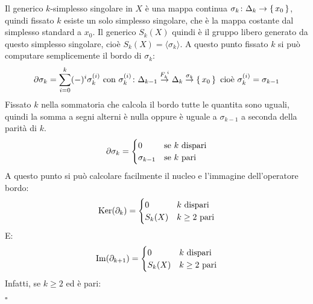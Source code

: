 \documentclass[10pt, twoside=false, x11names]{scrbook}
\newenvironment{proof}{{\textbf{Dimostrazione}:}}{\hfill $\square$}
\newcommand{\im}[1]{\mathrm{Im}( #1 )}
\renewcommand{\ker}[1]{\mathrm{Ker}( #1)}
\begin{document}
\begin{proof}
  Il generico $ k $-simplesso singolare in $ X $ è una mappa
  continua $ \sigma_k \colon \Delta_k \to \set{x_0} $, quindi fissato $ k $ esiste
  un solo simplesso singolare, che è la mappa costante dal simplesso
  standard a $ x_0 $. Il generico $ S_k(X) $ quindi è il gruppo libero
  generato da questo simplesso singolare, cioè $ S_k(X) = \langle\sigma_k\rangle $.
  A questo punto fissato $ k $ si può computare semplicemente il bordo di $ \sigma_k $:
  \[
    \partial \sigma_k = \sum_{i = 0}^k (-)^i \sigma_k^{(i)}  \text{ con }  \sigma_k^{(i)} \colon \Delta_{k-1} \overset{F_k^{\; i}}{\to} \Delta_k \overset{\sigma_k}{\to} \set{x_0}
    \text{ cioè } \sigma_k^{(i)}  = \sigma_{k-1}
  \]
  Fissato $ k $ nella sommatoria che calcola il bordo tutte le quantita sono uguali,
  quindi la somma a segni alterni è nulla oppure è uguale a $ \sigma_{k-1} $ a seconda
  della parità di $ k $.
  \[
    \partial \sigma_k =
    \begin{cases}
      0       & \text{se $ k $ dispari} \\
      \sigma_{k-1} & \text{se $ k $ pari}
    \end{cases}
  \]
  A questo punto si può calcolare facilmente il nucleo e l'immagine dell'operatore
  bordo:
  \[
    \ker{\partial_k} =
    \begin{cases}
      0       & \text{$ k $ dispari} \\
      S_k(X)  & \text{$ k \geq 2$ pari}
    \end{cases}
  \]
  E:
  \[
    \im{\partial_{k+1}} =
    \begin{cases}
      0       & \text{$ k $ dispari} \\
      S_k(X)  & \text{$ k \geq 2$ pari}
    \end{cases}
  \]
  Infatti, se $ k \geq 2 $ ed è pari:

\end{proof}
\end{document}
